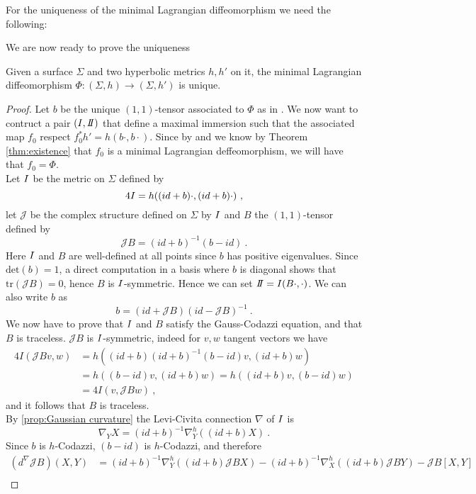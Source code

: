 For the uniqueness of the minimal Lagrangian diffeomorphism we need the following:

We are now ready to prove the uniqueness
\begin{theorem}
    Given a surface $\Sigma$ and two hyperbolic metrics $h, h'$ on it, the minimal Lagrangian diffeomorphism $\Phi : (\Sigma, h) \to (\Sigma, h')$ is unique.
\end{theorem}
\begin{proof}
    Let $b$ be the unique $(1,1)$-tensor associated to $\Phi$ as in . We now want to contruct a pair $(\I,\II)$ that define a maximal immersion such that the associated map $f_0$ respect $f_0^* h' = h(b \cdot, b \cdot)$. Since by  and we know by Theorem \ref{thm:existence} that $f_0$ is a minimal Lagrangian deffeomorphism, we will have that $f_0 = \Phi$.\\
    Let $I$ be the metric on $\Sigma$ defined by
    \[
        4 I = h((id + b)\cdot , (id + b)\cdot ) \ ,
    \]
    let $\mathcal{J}$ be the complex structure defined on $\Sigma$ by $I$ and $B$ the $(1,1)$-tensor defined by
    \[
        \mathcal{J} B = (id + b)^{-1} (b-id) \ .
    \]
    Here $I$ and $B$ are well-defined at all points since $b$ has positive eigenvalues. Since $\text{det}(b)=1$, a direct computation in a basis where $b$ is diagonal shows that $\text{tr}(\mathcal{J} B) = 0 $, hence $B$ is $I$-symmetric. Hence we can set $\II = \I (B \cdot, \cdot)$. We can also write $b$ as
    \[
        b = (id+\mathcal{J}B)(id - \mathcal{J}B)^{-1} \ .
    \]  
    We now have to prove that $I$ and $B$ satisfy the Gauss-Codazzi equation, and that $B$ is traceless.
    $\mathcal{J} B$ is $I$-symmetric, indeed for $v,w$ tangent vectors we have
    \[
    \begin{split}
        4I(\mathcal{J}B v,w) & = h((id + b) (id + b)^{-1} (b-id) v , (id + b)w) \\
        & = h((b-id) v , (id + b)w) = h((id + b) v , (b-id)w) \\
        & = 4 I (v, \mathcal{J}B w) \ ,
    \end{split}
    \]
    and it follows that $B$ is traceless.\\
    By \ref{prop:Gaussian curvature} the Levi-Civita connection $\nabla$ of $I$ is
    \[
        \nabla_Y X = (id + b)^{-1} \nabla^h_Y ((id+b)X) \ .
    \]
    Since $b$ is $h$-Codazzi, $(b-id)$ is $h$-Codazzi, and therefore
    \[
    \begin{split}
        (d^\nabla \mathcal{J}B)(X,Y) & = (id + b)^{-1} \nabla^h_Y ((id+b)\mathcal{J}B X) - (id + b)^{-1} \nabla^h_X ((id+b)\mathcal{J}B Y) - \mathcal{J}B \left[ X,Y \right] \\

\end{split}\]
\end{proof}
